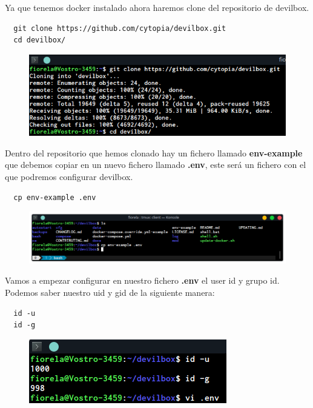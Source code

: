 \documentclass{article}
\begin{document}
Ya que tenemos docker instalado ahora haremos clone del repositorio de
devilbox.\\

\begin{verbatim}
  git clone https://github.com/cytopia/devilbox.git
  cd devilbox/
\end{verbatim}

\begin{figure}[h!]
  \centering
  \includegraphics[scale=0.75]{./Pictures/Devilbox/007_devilbox.png}
\end{figure}

Dentro del repositorio que hemos clonado hay un fichero llamado
\textbf{env-example} que debemos copiar en un nuevo fichero
llamado \textbf{.env}, este será un fichero con el que podremos configurar
devilbox.\\

\begin{verbatim}
  cp env-example .env
\end{verbatim}

\newpage

\begin{figure}[h!]
  \centering
  \includegraphics[scale=0.7]{./Pictures/Devilbox/008_devilbox.png}
\end{figure}

Vamos a empezar configurar en nuestro fichero \textbf{.env} el user id y
grupo id. Podemos saber nuestro uid y gid de la siguiente manera:

\begin{verbatim}
  id -u
  id -g
\end{verbatim}

\begin{figure}[h!]
  \centering
  \includegraphics[scale=0.75]{./Pictures/Devilbox/011_devilbox.png}
\end{figure}
\end{document}
